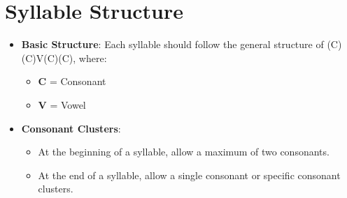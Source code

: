 

\section*{Syllable Structure}
\begin{itemize}
    \item \textbf{Basic Structure}: Each syllable should follow the general structure of (C)(C)V(C)(C), where:
    \begin{itemize}
        \item \textbf{C} = Consonant
        \item \textbf{V} = Vowel
    \end{itemize}
    \item \textbf{Consonant Clusters}:
    \begin{itemize}
        \item At the beginning of a syllable, allow a maximum of two consonants.
        \item At the end of a syllable, allow a single consonant or specific consonant clusters.
    \end{itemize}
\end{itemize}

